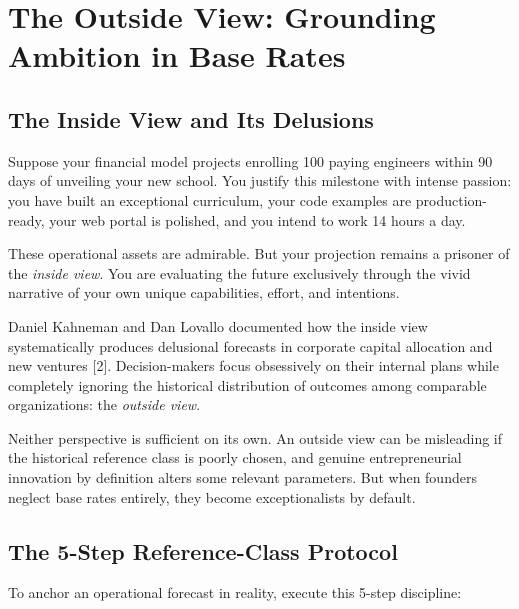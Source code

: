 \section{The Outside View: Grounding Ambition in Base Rates}

\subsection{The Inside View and Its Delusions}

Suppose your financial model projects enrolling 100 paying engineers within 90 days of unveiling your new school. You justify this milestone with intense passion: you have built an exceptional curriculum, your code examples are production-ready, your web portal is polished, and you intend to work 14 hours a day.

These operational assets are admirable. But your projection remains a prisoner of the \textit{inside view}. You are evaluating the future exclusively through the vivid narrative of your own unique capabilities, effort, and intentions.

Daniel Kahneman and Dan Lovallo documented how the inside view systematically produces delusional forecasts in corporate capital allocation and new ventures [2]. Decision-makers focus obsessively on their internal plans while completely ignoring the historical distribution of outcomes among comparable organizations: the \textit{outside view}.

Neither perspective is sufficient on its own. An outside view can be misleading if the historical reference class is poorly chosen, and genuine entrepreneurial innovation by definition alters some relevant parameters. But when founders neglect base rates entirely, they become exceptionalists by default.

\subsection{The 5-Step Reference-Class Protocol}

To anchor an operational forecast in reality, execute this 5-step discipline:

